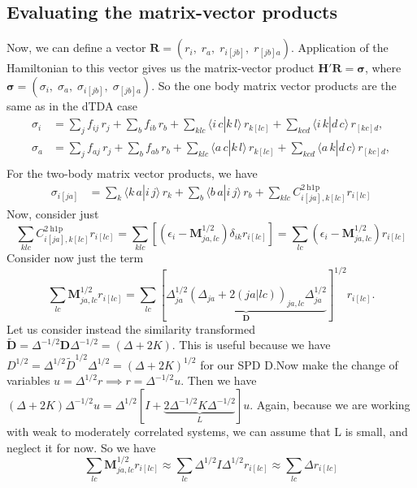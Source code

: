 \subsection{Evaluating the matrix-vector products}
Now, we can define a vector $\bm{R} = ( r_i,\; r_a,\; r_{i[jb]},\; r_{[jb]a} )$. Application of the Hamiltonian to this vector gives us the matrix-vector product $\bm{H'} \bm{R} = \bm{\sigma }$, where $\bm{\sigma} = ( \sigma_i,\; \sigma_a,\; \sigma_{i[jb]},\; \sigma_{[jb]a} )$. So the one body matrix vector products are the same as in the dTDA case
\begin{align}
\sigma_i &= 
  \sum_{j} f_{i j}\,r_j
  + \sum_{b} f_{i b}\,r_b
  + \sum_{k l c} \bigl\langle i\,c | k\,l \bigr\rangle\,r_{k[l c]}
  + \sum_{k c d} \bigl\langle i\,k | d\,c \bigr\rangle\,r_{[k c]d}, \\[6pt]
\sigma_a &=
    \sum_{j} f_{a j}\,r_j
    + \sum_{b} f_{a b}\,r_b
    + \sum_{k l c} \bigl\langle a\,c | k\,l \bigr\rangle\,r_{k[l c]}
    + \sum_{k c d} \bigl\langle a\,k | d\,c \bigr\rangle\,r_{[k c]d}, \\[6pt]
\end{align}
For the two-body matrix vector products, we have
\begin{align}
\sigma_{i[ja]} &=
    \sum_{k} \bigl\langle k\,a | i\,j \bigr\rangle\,r_k
    + \sum_{b} \bigl\langle b\,a | i\,j \bigr\rangle\,r_b
    + \sum_{klc} C_{i[j a], k[l c]}^{2 \mathrm{~h} 1 \mathrm{p}} r_{i[l c]}
\end{align}
Now, consider just
\begin{equation}
    \sum_{klc} C_{i[j a], k[l c]}^{2 \mathrm{~h} 1 \mathrm{p}} r_{i[l c]}= \sum_{klc} \left[\left(\epsilon_i-\bm{M}^{1/2}_{ja,lc}\right) \delta_{ik} r_{i[l c]} \right] = \sum_{l c} \left(\epsilon_i - \bm{M}^{1/2}_{ja,lc}\right) r_{i[l c]}
\end{equation}
Consider now just the term 
\begin{equation}
    \sum_{l c} \bm{M}^{1/2}_{ja,lc} r_{i[l c]} =  \sum_{l c} \left[\underbrace{\Delta _{ja}^{1/2} \left(\Delta_{ja} + 2(ja|lc)\right)_{ja,lc} \Delta_{ja}^{1/2}}_{\bm{D}}\right]^{1/2} r_{i[l c]}.
\end{equation}
Let us consider instead the similarity transformed $\tilde{\bm{D}} = \Delta^{-1/2} \bm{D} \Delta^{-1/2} = \left(\Delta + 2K\right)$. This is useful because we have $D^{1/2} = \Delta^{1/2}\tilde{D}^{1/2}\Delta^{1/2}=\left(\Delta+2K\right)^{1/2}$ for our SPD D.Now make the change of variables $u = \Delta^{1/2}r \implies r = \Delta^{-1/2}u$. Then we have $\left(\Delta + 2K\right) \Delta^{-1/2}u = \Delta^{1/2} \left[ {I} + \underbrace{2\Delta^{-1/2}K\Delta^{-1/2}}_{L}\right] u$. Again, because we are working with weak to moderately correlated systems, we can assume that L is small, and neglect it for now. So we have
\begin{equation}
    \sum_{l c} \bm{M}^{1/2}_{ja,lc} r_{i[l c]} \approx \sum_{l c} \Delta^{1/2} I \Delta^{1/2} r_{i[l c]} \approx \sum_{l c} \Delta r_{i[l c]}
\end{equation}

